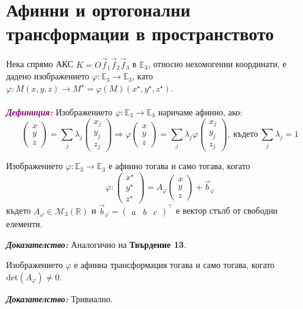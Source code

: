 \documentclass[12pt]{article}
\begin{document}
\part{Афинни и ортогонални трансформации в пространството}
Нека спрямо АКС $K=O\vec{f}_1\vec{f}_2\vec{f}_3$ в $\mathbb{E}_3$, относно нехомогенни координати, е дадено изображението $\varphi:\mathbb{E}_3\to\mathbb{E}_3$, като $\varphi:M(x,y,z)\to M^\star=\varphi(M)(x^\star, y^\star,z^\star)$. \\
\\
\textbf{\textit{\textcolor{purple}{Дефиниция:}}} Изображението $\varphi:\mathbb{E}_3\to\mathbb{E}_3$ наричаме афинно, ако:
$$\begin{pmatrix} x\\ y \\ z\end{pmatrix}=\sum_j \lambda_j \begin{pmatrix} x_j\\ y_j\\ z_j\end{pmatrix}\Rightarrow\varphi\begin{pmatrix} x\\ y\\ z\end{pmatrix}=\sum_j \lambda_j \varphi\begin{pmatrix} x_j\\ y_j\\ z_j\end{pmatrix},\ \text{където}\ \sum_j \lambda_j=1$$
\begin{tcolorbox}[
    colback=blue!5,    %
    colframe=blue!75!black, %
    title={\textbf{Твърдение 20:}}, %
    fonttitle=\bfseries,
    boxrule=0.8pt,
    arc=1mm,           %
    top=2mm, bottom=2mm, left=3mm, right=3mm
] Изображението $\varphi:\mathbb{E}_3\to\mathbb{E}_3$ е афинно тогава и само тогава, когато $$\varphi:\begin{pmatrix} x^\star \\ y^\star \\ z^\star\end{pmatrix}=A_\varphi\begin{pmatrix} x\\ y \\ z\end{pmatrix}+\vec{b}_{\varphi}$$ където $A_\varphi\in \mathcal M_3(\mathbb{R})$ и $\vec{b}_{\varphi}=\begin{pmatrix} a & b & c\end{pmatrix}^\top$ е вектор стълб от свободни елементи.
\end{tcolorbox}
\textbf{\textit{Доказателство:}} Аналогично на \textbf{Твърдение 13}.
\begin{tcolorbox}[
    colback=blue!5,    %
    colframe=blue!75!black, %
    title={\textbf{Твърдение 21:}}, %
    fonttitle=\bfseries,
    boxrule=0.8pt,
    arc=1mm,           %
    top=2mm, bottom=2mm, left=3mm, right=3mm
] Изображението $\varphi$ е афинна трансформация тогава и само тогава, когато $\mathrm{det}(A_\varphi)\neq 0$.
\end{tcolorbox}
\textbf{\textit{Доказателство:}} Тривиално.
\end{document}
